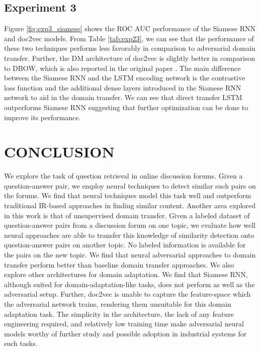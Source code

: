 \documentclass{sigkddExp}
\begin{document}
\subsection{Experiment 3}
Figure \ref{fig:exp3_siamese} shows the ROC AUC performance of the Siamese RNN and \textsf{doc2vec} models. From Table \ref{tab:exp23}, we can see that the performance of these two techniques performs less favorably in comparison to adversarial domain transfer. Further, the DM architecture of \textsf{doc2vec} is slightly better in comparison to DBOW, which is also reported in the original paper \cite{doc2vec_paper}. The main difference between the Siamese RNN and the LSTM encoding network is the contrastive loss function and the additional dense layers introduced in the Siamese RNN network to aid in the domain transfer. We can see that direct transfer LSTM outperforms Siamese RNN suggesting that further optimization can be done to improve its performance.

\section{CONCLUSION}
We explore the task of question retrieval in online discussion forums. Given a question-answer pair, we employ neural techniques to detect similar such pairs on the forums. We find that neural techniques model this task well and outperform traditional IR-based approaches in finding similar content. Another area explored in this work is that of unsupervised domain transfer. Given a labeled dataset of question-answer pairs from a discussion forum on one topic, we evaluate how well neural approaches are able to transfer this knowledge of similarity detection onto question-answer pairs on another topic. No labeled information is available for the pairs on the new topic. We find that neural adversarial approaches to domain transfer perform better than baseline domain transfer approaches. We also explore other architectures for domain adaptation. We find that Siamese RNN, although suited for domain-adaptation-like tasks, does not perform as well as the adversarial setup. Further, \textsf{doc2vec} is unable to capture the feature-space which the adversarial network trains, rendering them unsuitable for this domain adaptation task. The simplicity in the architecture, the lack of any feature engineering required, and relatively low training time make adversarial neural models worthy of further study and possible adoption in industrial systems for such tasks. 

\end{document}
